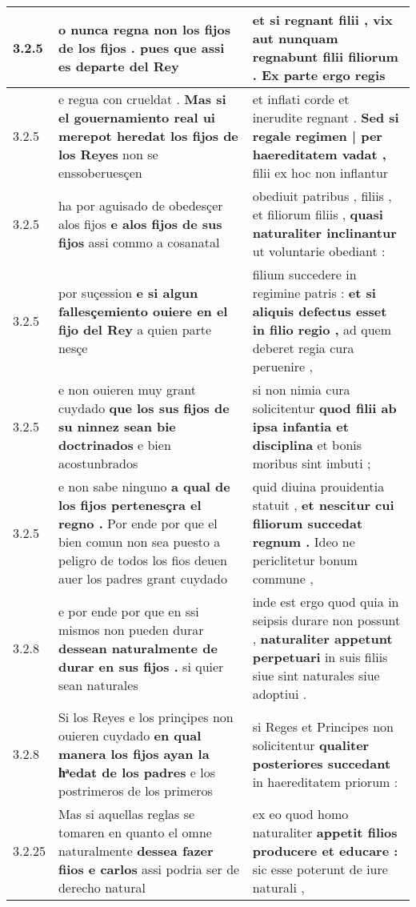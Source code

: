 \begin{tabular}{|p{1cm}|p{6.5cm}|p{6.5cm}|}
3.2.5 & o nunca regna \textbf{ non los fijos de los fijos . } pues que assi es departe del Rey & et si regnant filii , \textbf{ vix aut nunquam regnabunt filii filiorum . } Ex parte ergo regis \\\hline
3.2.5 & e regua con crueldat . \textbf{ Mas si el gouernamiento real ui merepot heredat los fijos de los Reyes } non se enssoberuesçen & et inflati corde et inerudite regnant . \textbf{ Sed si regale regimen | per haereditatem vadat , } filii ex hoc non inflantur \\\hline
3.2.5 & ha por aguisado de obedesçer alos fijos \textbf{ e alos fijos de sus fijos } assi commo a cosanatal & obediuit patribus , filiis , et filiorum filiis , \textbf{ quasi naturaliter inclinantur } ut voluntarie obediant : \\\hline
3.2.5 & por suçession \textbf{ e si algun fallesçemiento ouiere en el fijo del Rey } a quien parte nesçe & filium succedere in regimine patris : \textbf{ et si aliquis defectus esset in filio regio , } ad quem deberet regia cura peruenire , \\\hline
3.2.5 & e non ouieren muy grant cuydado \textbf{ que los sus fijos de su ninnez sean bie doctrinados } e bien acostunbrados & si non nimia cura solicitentur \textbf{ quod filii ab ipsa infantia et disciplina } et bonis moribus sint imbuti ; \\\hline
3.2.5 & e non sabe ninguno \textbf{ a qual de los fijos pertenesçra el regno . } Por ende por que el bien comun non sea puesto a peligro de todos los fios deuen auer los padres grant cuydado & quid diuina prouidentia statuit , \textbf{ et nescitur cui filiorum succedat regnum . } Ideo ne periclitetur bonum commune , \\\hline
3.2.8 & e por ende por que en ssi mismos non pueden durar \textbf{ dessean naturalmente de durar en sus fijos . } si quier sean naturales & inde est ergo quod quia in seipsis durare non possunt , \textbf{ naturaliter appetunt perpetuari } in suis filiis siue sint naturales siue adoptiui . \\\hline
3.2.8 & Si los Reyes e los prinçipes non ouieren cuydado \textbf{ en qual manera los fijos ayan la hͣedat de los padres } e los postrimeros de los primeros & si Reges et Principes non solicitentur \textbf{ qualiter posteriores succedant } in haereditatem priorum : \\\hline
3.2.25 & Mas si aquellas reglas se tomaren en quanto el omne naturalmente \textbf{ dessea fazer fiios e carlos } assi podria ser de derecho natural & ex eo quod homo naturaliter \textbf{ appetit filios producere et educare : } sic esse poterunt de iure naturali , \\\hline

\end{tabular}

